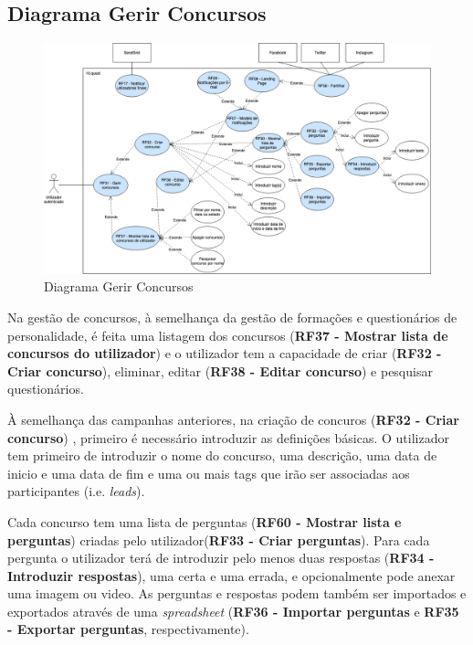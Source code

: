 \subsection{Diagrama Gerir Concursos}
\label{d:concursos}
\begin{figure}[ht!]
	\begin{center}
		\includegraphics[width=1\textwidth]{img/rf/gerir-concurso}
		\caption{Diagrama Gerir Concursos}
		\label{fig:rf-gerir-concursos}
	\end{center}
\end{figure}


Na gestão de concursos, à semelhança da gestão de formações e questionários de personalidade, é feita uma listagem dos concursos (\textbf{RF37 - Mostrar lista de concursos do utilizador}) e o utilizador tem a capacidade de criar (\textbf{RF32 - Criar concurso}), eliminar, editar (\textbf{RF38 - Editar concurso}) e pesquisar questionários.

À semelhança das campanhas anteriores, na criação de concuros (\textbf{RF32 - Criar concurso}) , primeiro é necessário introduzir as definições básicas. O utilizador tem primeiro de introduzir o nome do concurso, uma descrição, uma data de inicio e uma data de fim e uma ou mais tags que irão ser associadas aos participantes (i.e. \textit{leads}).

Cada concurso tem uma lista de perguntas (\textbf{RF60 - Mostrar lista e perguntas}) criadas pelo utilizador(\textbf{RF33 - Criar perguntas}). Para cada pergunta o utilizador terá de introduzir pelo menos duas respostas (\textbf{RF34 - Introduzir respostas}), uma certa e uma errada, e opcionalmente pode anexar uma imagem ou video. As perguntas e respostas podem também ser importados e exportados através de uma  \textit{spreadsheet} (\textbf{RF36 - Importar perguntas} e \textbf{RF35 - Exportar perguntas}, respectivamente).

